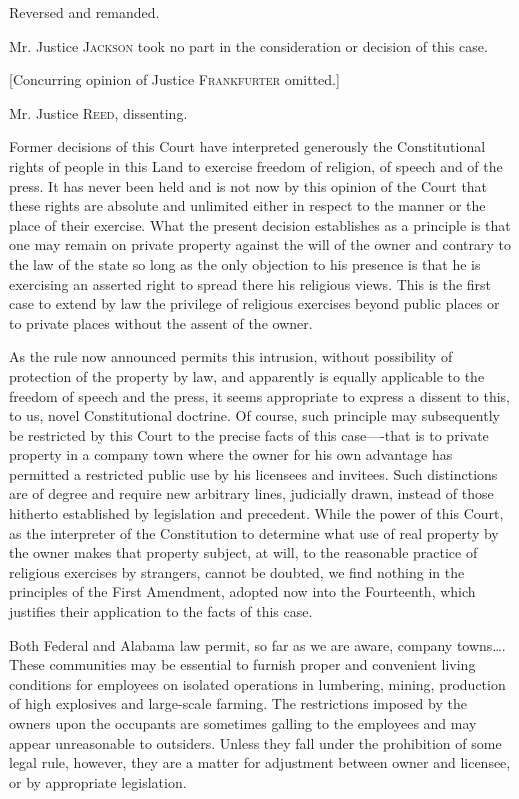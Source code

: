 Reversed and remanded.

Mr. Justice \textsc{Jackson} took no part in the consideration or decision of
this case. 

[Concurring opinion of Justice \textsc{Frankfurter} omitted.]

\opinion Mr. Justice \textsc{Reed}, dissenting.

Former decisions of this Court have interpreted generously the Constitutional
rights of people in this Land to exercise freedom of religion, of speech and of
the press.  It has never been held and is not now by this opinion of the Court
that these rights are absolute and unlimited either in respect to the manner or
the place of their exercise.  What the present decision establishes as a
principle is that one may remain on private property against the will of the
owner and contrary to the law of the state so long as the only objection to his
presence is that he is exercising an asserted right to spread there his
religious views.  This is the first case to extend by law the privilege of
religious exercises beyond public places or to private places without the
assent of the owner.

As the rule now announced permits this intrusion, without possibility of
protection of the property by law, and apparently is equally applicable to the
freedom of speech and the press, it seems appropriate to express a dissent to
this, to us, novel Constitutional doctrine. Of course, such principle may
subsequently be restricted by this Court to the precise facts of this
case----that
is to private property in a company town where the owner for his own advantage
has permitted a restricted public use by his licensees and invitees. Such
distinctions are of degree and require new arbitrary lines, judicially drawn,
instead of those hitherto established by legislation and precedent. While the
power of this Court, as the interpreter of the Constitution to determine what
use of real property by the owner makes that property subject, at will, to the
reasonable practice of religious exercises by strangers, cannot be doubted, we
find nothing in the principles of the First Amendment, adopted now into the
Fourteenth, which justifies their application to the facts of this case. 

Both Federal and Alabama law permit, so far as we are aware, company
towns\ldots. These communities may be essential to furnish proper and
convenient living conditions for employees on isolated operations in lumbering,
mining, production of high explosives and large-scale farming. The restrictions
imposed by the owners upon the occupants are sometimes galling to the employees
and may appear unreasonable to outsiders. Unless they fall under the
prohibition of some legal rule, however, they are a matter for adjustment
between owner and licensee, or by appropriate legislation.

